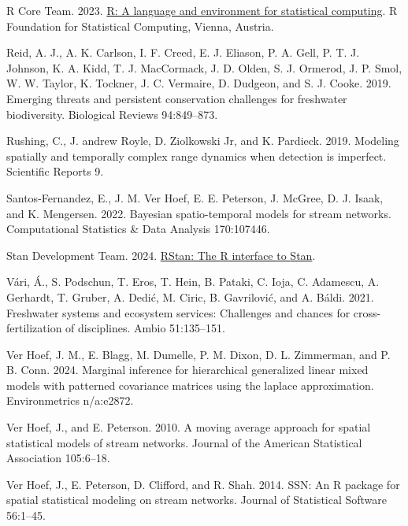\documentclass[
  11pt,
  a4paper,
]{article}
\newlength{\cslhangindent}
\newenvironment{CSLReferences}[2] %
 {\begin{list}{}{%
  \setlength{\itemindent}{0pt}
  \setlength{\leftmargin}{0pt}
  \setlength{\parsep}{0pt}
  \ifodd #1
   \setlength{\leftmargin}{\cslhangindent}
   \setlength{\itemindent}{-1\cslhangindent}
  \fi
  \setlength{\itemsep}{#2\baselineskip}}}
 {\end{list}}
\begin{document}
\begin{CSLReferences}{1}{0}
R Core Team. 2023. \href{https://www.R-project.org/}{R: A language and environment for statistical computing}. R Foundation for Statistical Computing, Vienna, Austria.

Reid, A. J., A. K. Carlson, I. F. Creed, E. J. Eliason, P. A. Gell, P. T. J. Johnson, K. A. Kidd, T. J. MacCormack, J. D. Olden, S. J. Ormerod, J. P. Smol, W. W. Taylor, K. Tockner, J. C. Vermaire, D. Dudgeon, and S. J. Cooke. 2019. Emerging threats and persistent conservation challenges for freshwater biodiversity. Biological Reviews 94:849--873.

Rushing, C., J. andrew Royle, D. Ziolkowski Jr, and K. Pardieck. 2019. Modeling spatially and temporally complex range dynamics when detection is imperfect. Scientific Reports 9.

Santos-Fernandez, E., J. M. Ver Hoef, E. E. Peterson, J. McGree, D. J. Isaak, and K. Mengersen. 2022. Bayesian spatio-temporal models for stream networks. Computational Statistics \& Data Analysis 170:107446.

Stan Development Team. 2024. \href{https://mc-stan.org/}{{RStan}: The {R} interface to {Stan}}.

Vári, Á., S. Podschun, T. Eros, T. Hein, B. Pataki, C. Ioja, C. Adamescu, A. Gerhardt, T. Gruber, A. Dedić, M. Ciric, B. Gavrilović, and A. Báldi. 2021. Freshwater systems and ecosystem services: Challenges and chances for cross-fertilization of disciplines. Ambio 51:135--151.

Ver Hoef, J. M., E. Blagg, M. Dumelle, P. M. Dixon, D. L. Zimmerman, and P. B. Conn. 2024. Marginal inference for hierarchical generalized linear mixed models with patterned covariance matrices using the laplace approximation. Environmetrics n/a:e2872.

Ver Hoef, J., and E. Peterson. 2010. A moving average approach for spatial statistical models of stream networks. Journal of the American Statistical Association 105:6--18.

Ver Hoef, J., E. Peterson, D. Clifford, and R. Shah. 2014. {SSN}: An {R} package for spatial statistical modeling on stream networks. Journal of Statistical Software 56:1--45.


\end{CSLReferences}
\end{document}
